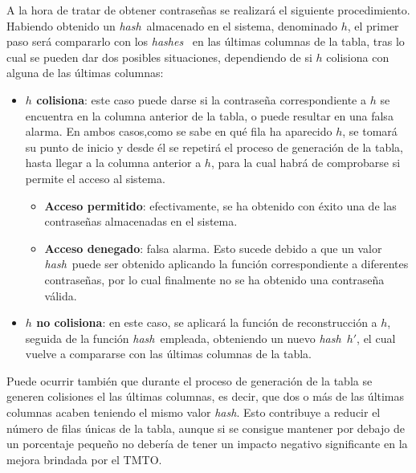\documentclass[12pt,spanish,listoffigures,listoftables]{tfgetsinf}
\newcommand{\hash}{\textit{hash}}
\newcommand{\hashes}{\textit{hashes}}
\begin{document}
A la hora de tratar de obtener contraseñas se realizará el siguiente procedimiento. Habiendo obtenido un \hash~almacenado en el sistema, denominado $h$, el primer paso será compararlo con los \hashes~ en las últimas columnas de la tabla, tras lo cual se pueden dar dos posibles situaciones, dependiendo de si $h$ colisiona con alguna de las últimas columnas:

\begin{itemize}

    \item \textbf{$h$ colisiona}: este caso puede darse si la contraseña correspondiente a $h$ se encuentra en la columna anterior de la tabla, o puede resultar en una falsa alarma. En ambos casos,como se sabe en qué fila ha aparecido $h$, se tomará su punto de inicio y desde él se repetirá el proceso de generación de la tabla, hasta llegar a la columna anterior a $h$, para la cual habrá de comprobarse si permite el acceso al sistema.
    \begin{itemize}
    
        \item \textbf{Acceso permitido}: efectivamente, se ha obtenido con éxito una de las contraseñas almacenadas en el sistema.
        
        \item \textbf{Acceso denegado}: falsa alarma. Esto sucede debido a que un valor \hash~puede ser obtenido aplicando la función correspondiente a diferentes contraseñas, por lo cual finalmente no se ha obtenido una contraseña válida.
        
    \end{itemize}

    \item \textbf{$h$ no colisiona}: en este caso, se aplicará la función de reconstrucción a $h$, seguida de la función \hash~empleada, obteniendo un nuevo \hash~$h'$, el cual vuelve a compararse con las últimas columnas de la tabla.
    
\end{itemize}

Puede ocurrir también que durante el proceso de generación de la tabla se generen colisiones el las últimas columnas, es decir, que dos o más de las últimas columnas acaben teniendo el mismo valor \hash. Esto contribuye a reducir el número de filas únicas de la tabla, aunque si se consigue mantener por debajo de un porcentaje pequeño no debería de tener un impacto negativo significante en la mejora brindada por el TMTO.
\end{document}
